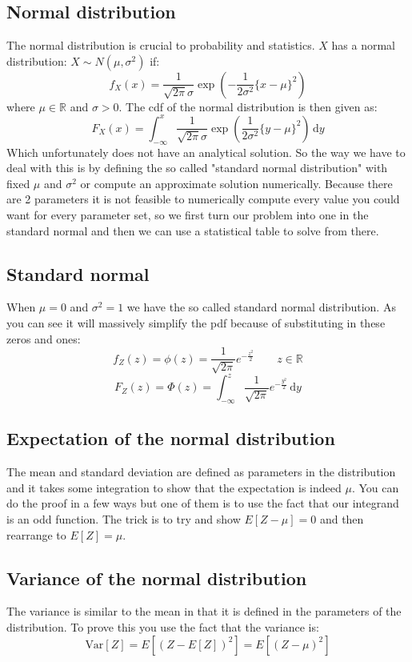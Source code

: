 \documentclass[12pt]{article}
\newcommand{\Var}[1]{\text{Var}[#1]}
\begin{document}
\subsection*{Normal distribution}
The normal distribution is crucial to probability and statistics. \(X\) has a normal distribution: \(X\sim N(\mu,\sigma^2)\) if:
\[f_X(x)=\frac{1}{\sqrt{2\pi}\sigma}\exp{\left(-\frac{1}{2\sigma^2}\{x-\mu\}^2\right)}\]
where \(\mu\in\mathbb{R}\) and \(\sigma>0\). The cdf of the normal distribution is then given as:
\[F_X(x)=\int^x_{-\infty}\frac{1}{\sqrt{2\pi}\sigma}\exp\left(\frac{1}{2\sigma^2}\{y-\mu\}^2\right)\,\text{d}y\]
Which unfortunately does not have an analytical solution. So the way we have to deal with this is by defining the so called "standard normal distribution" with fixed \(\mu\) and \(\sigma^2\) or compute an approximate solution numerically. Because there are 2 parameters it is not feasible to numerically compute every value you could want for every parameter set, so we first turn our problem into one in the standard normal and then we can use a statistical table to solve from there.
\subsection*{Standard normal}
When \(\mu=0\) and \(\sigma^2=1\) we have the so called standard normal distribution. As you can see it will massively simplify the pdf because of substituting in these zeros and ones:
\[f_Z(z)=\phi(z)=\frac{1}{\sqrt{2\pi}}e^{-\frac{z^2}{2}}\qquad z\in\mathbb{R}\]
\[F_Z(z)=\Phi(z)=\int^z_{-\infty}\frac{1}{\sqrt{2\pi}}e^{-\frac{y^2}{2}}\,\text{d}y\]
\subsection*{Expectation of the normal distribution}
The mean and standard deviation are defined as parameters in the distribution and it takes some integration to show that the expectation is indeed \(\mu\). You can do the proof in a few ways but one of them is to use the fact that our integrand is an odd function. The trick is to try and show \(E[Z-\mu]=0\) and then rearrange to \(E[Z]=\mu\).
\subsection*{Variance of the normal distribution}
The variance is similar to the mean in that it is defined in the parameters of the distribution. To prove this you use the fact that the variance is:
\[\Var{Z}=E[(Z-E[Z])^2]=E[(Z-\mu)^2]\]
\end{document}
